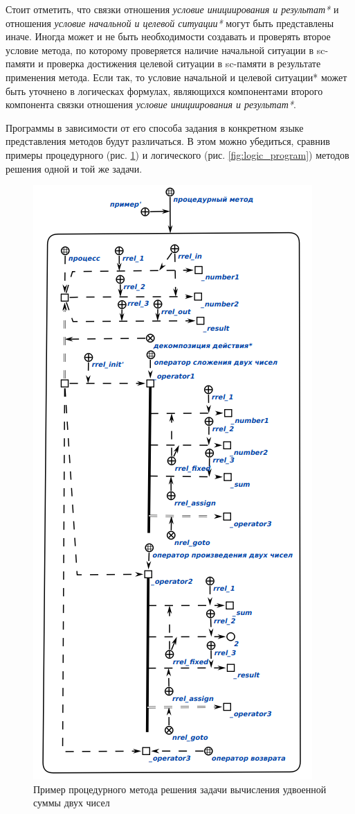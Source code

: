 Стоит отметить, что связки отношения \textit{условие инициирования и результат*} и отношения \textit{условие начальной и целевой ситуации*} могут быть представлены иначе. Иногда может и не быть необходимости создавать и проверять второе условие метода, по которому проверяется наличие начальной ситуации в sc-памяти и проверка достижения целевой ситуации в sc-памяти в результате применения метода. Если так, то условие начальной и целевой ситуации* может быть уточнено в логическах формулах, являющихся компонентами второго компонента связки отношения \textit{условие инициирования и результат*}.

Программы в зависимости от его способа задания в конкретном языке представления методов будут различаться. В этом можно убедиться, сравнив примеры процедурного (рис. \ref{fig:procedural_program}) и логического (рис. \ref{fig:logic_program}) методов решения одной и той же задачи.

\begin{figure}[htbp]  
  \center
  \includegraphics[scale=0.6]{author/part3/figures/procedural_program.png}
  \caption{Пример процедурного метода решения задачи вычисления удвоенной суммы двух чисел}
  \label{fig:procedural_program}
\end{figure}

